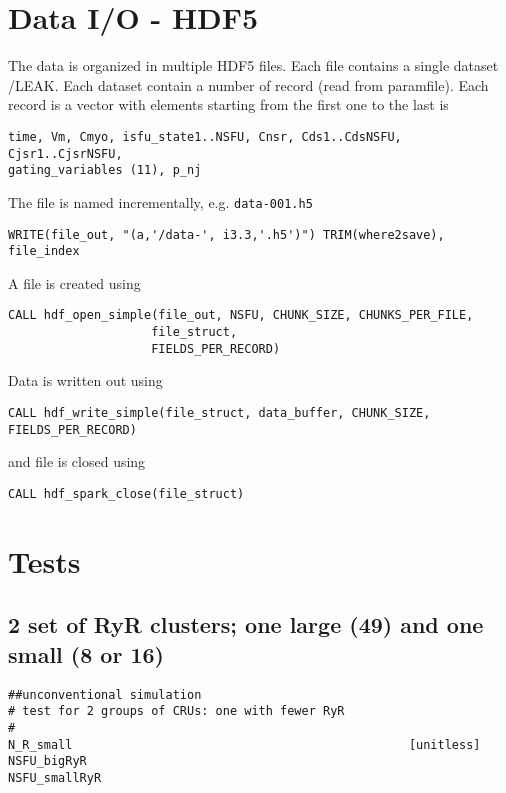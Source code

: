 \section{Data I/O - HDF5}
\label{sec:leak_hdf5}

The data is organized in multiple HDF5 files. Each file contains a single
dataset /LEAK. Each dataset contain a number of record (read from paramfile).
Each record is a vector with elements starting from the first one to the last is
\begin{verbatim}
time, Vm, Cmyo, isfu_state1..NSFU, Cnsr, Cds1..CdsNSFU, Cjsr1..CjsrNSFU,
gating_variables (11), p_nj
\end{verbatim}

The file is named incrementally, e.g.
\verb!data-001.h5!
\begin{verbatim}
WRITE(file_out, "(a,'/data-', i3.3,'.h5')") TRIM(where2save), file_index 
\end{verbatim}
A file is created using
\begin{verbatim}
CALL hdf_open_simple(file_out, NSFU, CHUNK_SIZE, CHUNKS_PER_FILE, 
                    file_struct,
                    FIELDS_PER_RECORD)
\end{verbatim}
Data is written out using 
\begin{verbatim}
CALL hdf_write_simple(file_struct, data_buffer, CHUNK_SIZE, FIELDS_PER_RECORD)
\end{verbatim}
and file is closed using
\begin{verbatim}
CALL hdf_spark_close(file_struct)
\end{verbatim}



\section{Tests}
\label{sec:leak_tests}

\subsection{2 set of RyR clusters; one large (49) and one small (8 or 16)}
\label{sec:leak_tests_hetero}

\begin{verbatim}
##unconventional simulation
# test for 2 groups of CRUs: one with fewer RyR
# 
N_R_small                                               [unitless]
NSFU_bigRyR
NSFU_smallRyR
\end{verbatim}

